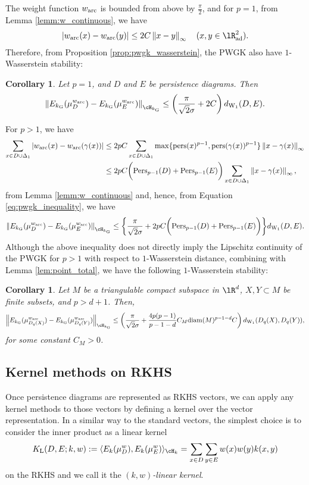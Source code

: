 \documentclass{article}
\newtheorem{cor}[thm]{Corollary}
\newcommand{\DD}{{\Delta}}
\newcommand{\Pers}{{\rm Pers}}
\newcommand{\pers}{{\rm pers}}
\newcommand{\diam}{{\rm diam}}
\providecommand{\abs}[1]{\left\lvert#1\right\rvert}
\providecommand{\norm}[1]{\left\lVert#1\right\rVert}
\providecommand{\pare}[1]{\left( #1 \right)}
\providecommand{\inn}[2]{\langle #1, #2 \rangle}
\providecommand{\Ek}[3]{E_{#1}(\mu^{#2}_{#3})}
\providecommand{\dk}[4]{\norm{E_{#1}(\mu^{#2}_{#3}) - E_{#1}(\mu^{#2}_{#4})}_{\cH_{#1}}}
\begin{document}
The weight function $w_{{\rm arc}}$ is bounded from above by $\frac{\pi}{2}$, and for $p=1$, from Lemma \ref{lemm:w_continuous}, we have
\[
\abs{w_{{\rm arc}}(x)-w_{{\rm arc}}(y)} \leq 2C \norm{x-y}_{\infty} ~~~ (x,y \in \lR^{2}_{{\rm ad}}) .
\]
Therefore, from Proposition \ref{prop:pwgk_wasserstein}, the PWGK also have $1$-Wasserstein stability:
\begin{cor}
Let $p=1$, and $D$ and $E$ be persistence diagrams.
Then
\[
\dk{k_{{\rm G}}}{w_{{\rm arc}}}{D}{E} \leq \pare{ \frac{\pi}{\sqrt{2}\sigma} +2C} d_{ {\rm W}_{1}}(D,E).
\]
\end{cor}

For $p>1$, we have
\begin{align*}
\sum_{x \in D \cup \DD_{1}} \abs{w_{{\rm arc}}(x)-w_{{\rm arc}}(\gamma(x))}
& \leq 2pC \sum_{x \in D \cup \DD_{1}} \max \{ \pers(x)^{p-1}, \pers(\gamma(x))^{p-1} \} \norm{x-\gamma(x)}_{\infty} \\
& \leq 2pC \biggl( \Pers_{p-1}(D) + \Pers_{p-1}(E) \biggr) \sum_{x \in D \cup \DD_{1}}  \norm{x-\gamma(x)}_{\infty},
\end{align*}
from Lemma \ref{lemm:w_continuous} and, hence, from Equation \eqref{eq:pwgk_inequality}, we have
\[
\dk{k_{{\rm G}}}{w_{{\rm arc}}}{D}{E} \leq \biggl\{ \frac{\pi}{\sqrt{2}\sigma} +2pC \biggl( \Pers_{p-1}(D) + \Pers_{p-1}(E) \biggr) \biggr\} d_{ {\rm W}_{1}}(D,E).
\]
Although the above inequality does not directly imply the Lipschitz continuity of the PWGK for $p>1$ with respect to $1$-Wasserstein distance, combining with Lemma \ref{lem:point_total}, we have the following $1$-Wasserstein stability:
\begin{cor}
Let $M$ be a triangulable compact subspace in $\lR^{d}$, $X,Y \subset M$ be finite subsets, and $p>d+1$.
Then,
\[
\dk{k_{{\rm G}}}{w_{{\rm arc}}}{D_{q}(X)}{D_{q}(Y)} \leq \pare{ \frac{\pi}{\sqrt{2}\sigma} + \frac{4p(p-1)}{p-1-d} C_{M}\diam(M)^{p-1-d} C}  d_{ {\rm W}_{1}}(D_{q}(X),D_{q}(Y)),
\]
for some constant $C_{M} > 0$.
\end{cor}



\subsection{Kernel methods on RKHS}

Once persistence diagrams are represented as RKHS vectors, we can apply any kernel methods to those vectors by defining a kernel over the vector representation.
In a similar way to the standard vectors, the simplest choice is to consider the inner product as a linear kernel
\begin{align}
K_{{\rm L}}(D,E;k,w):= \inn{\Ek{k}{w}{D}}{\Ek{k}{w}{E}}_{\cH_{k}} =\sum_{x \in D} \sum_{y \in E} w(x)w(y)k(x,y)  \label{eq:linear_rkhs}
\end{align}
on the RKHS and we call it the {\em $(k,w)$-linear kernel}.  
\end{document}
